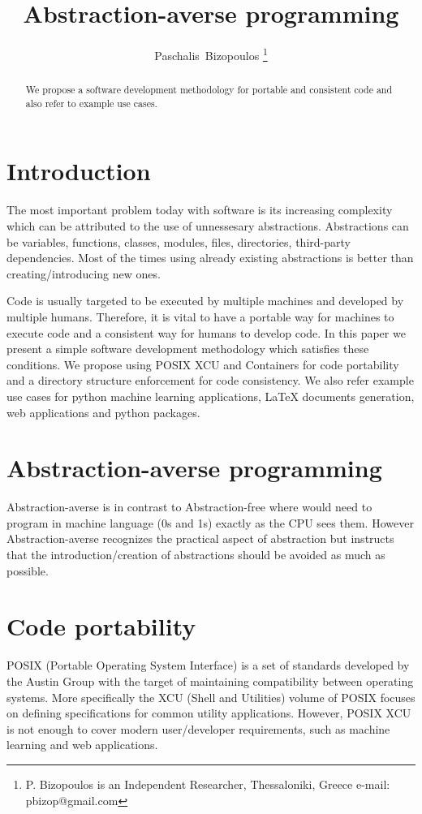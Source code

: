\documentclass[journal]{IEEEtran}
\begin{document}
\title{Abstraction-averse programming}

\author{Paschalis~Bizopoulos
\thanks{P. Bizopoulos is an Independent Researcher, Thessaloniki, Greece e-mail: pbizop@gmail.com}}

\maketitle

\begin{abstract}
	We propose a software development methodology for portable and consistent code and also refer to example use cases.
\end{abstract}

\section{Introduction}
The most important problem today with software is its increasing complexity which can be attributed to the use of unnessesary abstractions.
Abstractions can be variables, functions, classes, modules, files, directories, third-party dependencies.
Most of the times using already existing abstractions is better than creating/introducing new ones.

Code is usually targeted to be executed by multiple machines and developed by multiple humans.
Therefore, it is vital to have a portable way for machines to execute code and a consistent way for humans to develop code.
In this paper we present a simple software development methodology which satisfies these conditions.
We propose using POSIX XCU and Containers for code portability and a directory structure enforcement for code consistency.
We also refer example use cases for python machine learning applications, \LaTeX{} documents generation, web applications and python packages.

\section{Abstraction-averse programming}
Abstraction-averse is in contrast to Abstraction-free where would need to program in machine language (0s and 1s) exactly as the CPU sees them.
However Abstraction-averse recognizes the practical aspect of abstraction but instructs that the introduction/creation of abstractions should be avoided as much as possible.

\section{Code portability}
POSIX (Portable Operating System Interface) is a set of standards developed by the Austin Group with the target of maintaining compatibility between operating systems.
More specifically the XCU (Shell and Utilities) volume of POSIX focuses on defining specifications for common utility applications.
However, POSIX XCU is not enough to cover modern user/developer requirements, such as machine learning and web applications.
\end{document}
